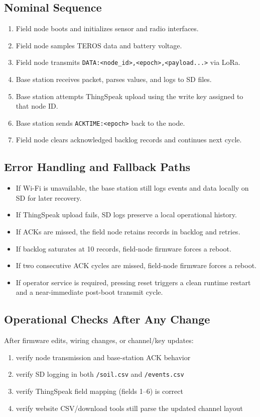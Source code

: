 \documentclass[11pt]{article}
\begin{document}
\subsection{Nominal Sequence}
\begin{enumerate}
    \item Field node boots and initializes sensor and radio interfaces.
    \item Field node samples TEROS data and battery voltage.
    \item Field node transmits \texttt{DATA:<node\_id>,<epoch>,<payload...>} via LoRa.
    \item Base station receives packet, parses values, and logs to SD files.
    \item Base station attempts ThingSpeak upload using the write key assigned to that node ID.
    \item Base station sends \texttt{ACKTIME:<epoch>} back to the node.
    \item Field node clears acknowledged backlog records and continues next cycle.
\end{enumerate}

\subsection{Error Handling and Fallback Paths}
\begin{itemize}
    \item If Wi-Fi is unavailable, the base station still logs events and data locally on SD for later recovery.
    \item If ThingSpeak upload fails, SD logs preserve a local operational history.
    \item If ACKs are missed, the field node retains records in backlog and retries.
    \item If backlog saturates at 10 records, field-node firmware forces a reboot.
    \item If two consecutive ACK cycles are missed, field-node firmware forces a reboot.
    \item If operator service is required, pressing reset triggers a clean runtime restart and a near-immediate post-boot transmit cycle.
\end{itemize}

\subsection{Operational Checks After Any Change}
After firmware edits, wiring changes, or channel/key updates:
\begin{enumerate}
    \item verify node transmission and base-station ACK behavior
    \item verify SD logging in both \texttt{/soil.csv} and \texttt{/events.csv}
    \item verify ThingSpeak field mapping (fields 1--6) is correct
    \item verify website CSV/download tools still parse the updated channel layout
\end{enumerate}
\end{document}
